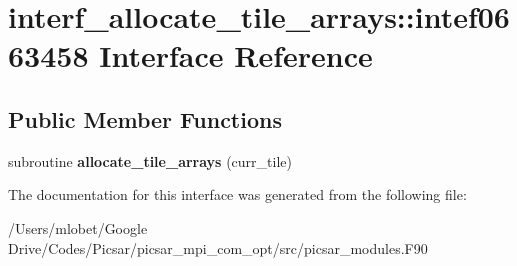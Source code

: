\hypertarget{interfaceinterf__allocate__tile__arrays_1_1intef0663458}{}\section{interf\+\_\+allocate\+\_\+tile\+\_\+arrays\+:\+:intef0663458 Interface Reference}
\label{interfaceinterf__allocate__tile__arrays_1_1intef0663458}
\subsection*{Public Member Functions}
\begin{DoxyCompactItemize}
\item 
subroutine {\bfseries allocate\+\_\+tile\+\_\+arrays} (curr\+\_\+tile)\hypertarget{interfaceinterf__allocate__tile__arrays_1_1intef0663458_a8d9cd50dd73edb052e4cca91f0147c68}{}\label{interfaceinterf__allocate__tile__arrays_1_1intef0663458_a8d9cd50dd73edb052e4cca91f0147c68}

\end{DoxyCompactItemize}


The documentation for this interface was generated from the following file\+:\begin{DoxyCompactItemize}
\item 
/\+Users/mlobet/\+Google Drive/\+Codes/\+Picsar/picsar\+\_\+mpi\+\_\+com\+\_\+opt/src/picsar\+\_\+modules.\+F90\end{DoxyCompactItemize}
